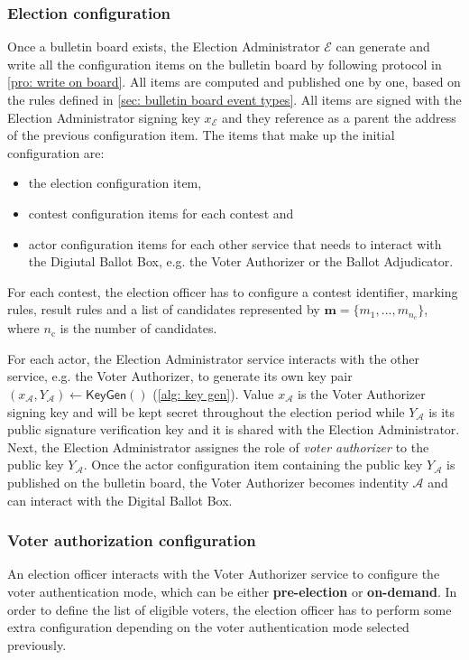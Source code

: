 \subsubsection{Election configuration} \label{sec: election configuration}
Once a bulletin board exists, the Election Administrator $\mathcal{E}$ can generate and write all the configuration items on the bulletin board by following protocol in \cref{pro: write on board}. All items are computed and published one by one, based on the rules defined in \cref{sec: bulletin board event types}. All items are signed with the Election Administrator signing key $x_\mathcal{E}$ and they reference as a parent the address of the previous configuration item. The items that make up the initial configuration are:
\begin{itemize}
    \item the election configuration item,
    \item contest configuration items for each contest and
    \item actor configuration items for each other service that needs to interact with the Digiutal Ballot Box, e.g. the Voter Authorizer or the Ballot Adjudicator.
\end{itemize}

For each contest, the election officer has to configure a contest identifier, marking rules, result rules and a list of candidates represented by $\boldsymbol{m} = \{ m_1, ..., m_{n_\mathrm{c}} \}$, where $n_\mathrm{c}$ is the number of candidates.

For each actor, the Election Administrator service interacts with the other service, e.g. the Voter Authorizer, to generate its own key pair $(x_\mathcal{A}, Y_\mathcal{A}) \gets \mathsf{KeyGen}()$ (\cref{alg: key gen}). Value $x_\mathcal{A}$ is the Voter Authorizer signing key and will be kept secret throughout the election period while $Y_\mathcal{A}$ is its public signature verification key and it is shared with the Election Administrator. Next, the Election Administrator assignes the role of \textit{voter authorizer} to the public key $Y_\mathcal{A}$. Once the actor configuration item containing the public key $Y_\mathcal{A}$ is published on the bulletin board, the Voter Authorizer becomes indentity $\mathcal{A}$ and can interact with the Digital Ballot Box.


\subsubsection{Voter authorization configuration} \label{sec: voter authorization configuration}
An election officer interacts with the Voter Authorizer service to configure the voter authentication mode, which can be either \textbf{pre-election} or \textbf{on-demand}. In order to define the list of eligible voters, the election officer has to perform some extra configuration depending on the voter authentication mode selected previously.


